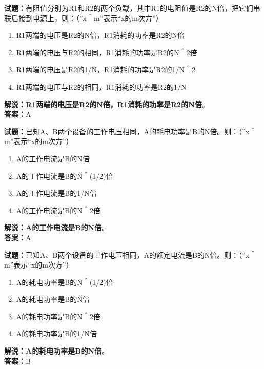\documentclass{ctexbook}
\begin{document}
\bigskip


\noindent\textbf{试题：}有阻值分别为R1和R2的两个负载，其中R1的电阻值是R2的N倍，把它们串联后接到电源上，则：（”x＾m”表示“x的m次方”）
\begin{enumerate}[leftmargin=3em]
\item R1两端的电压是R2的N倍，R1消耗的功率是R2的N倍
\item R1两端的电压与R2的相同，R1消耗的功率是R2的N＾2倍
\item R1两端的电压是R2的1/N，R1消耗的功率是R2的1/N＾2
\item R1两端的电压与R2的相同，R1消耗的功率是R2的1/N
\end{enumerate}
\noindent\textbf{解说：}\textbf{R1两端的电压是R2的N倍，R1消耗的功率是R2的N倍}。\\\noindent\textbf{答案：}A



\bigskip


\noindent\textbf{试题：}已知A、B两个设备的工作电压相同，A的耗电功率是B的N倍。则：（”x＾m”表示“x的m次方”）
\begin{enumerate}[leftmargin=3em]
\item A的工作电流是B的N倍
\item A的工作电流是B的N＾(1/2)倍
\item A的工作电流是B的1/N倍
\item A的工作电流是B的N＾2倍
\end{enumerate}
\noindent\textbf{解说：}\textbf{A的工作电流是B的N倍}。\\\noindent\textbf{答案：}A



\bigskip


\noindent\textbf{试题：}已知A、B两个设备的工作电压相同，A的额定电流是B的N倍。则：（”x＾m”表示“x的m次方”）
\begin{enumerate}[leftmargin=3em]
\item A的耗电功率是B的N＾(1/2)倍
\item A的耗电功率是B的N倍
\item A的耗电功率是B的N＾2倍
\item A的耗电功率是B的1/N倍
\end{enumerate}
\noindent\textbf{解说：}\textbf{A的耗电功率是B的N倍}。\\\noindent\textbf{答案：}B


\bigskip
\end{document}
